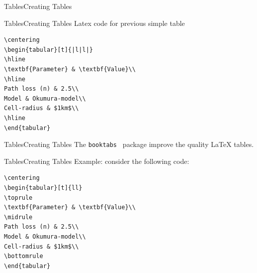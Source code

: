 \documentclass{beamer}
\begin{document}
\begin{darkframes}
\begin{frame}[fragile]{Tables}{Creating Tables}
\end{frame}

\begin{frame}[fragile]{Tables}{Creating Tables}
Latex code for previous simple table\\
	\begin{verbatim}
\centering
\begin{tabular}[t]{|l|l|}
\hline 
\textbf{Parameter} & \textbf{Value}\\
\hline 
Path loss (n) & 2.5\\
Model & Okumura-model\\
Cell-radius & $1km$\\
\hline
\end{tabular}
	\end{verbatim}
	
	
\end{frame}


\begin{frame}[fragile]{Tables}{Creating Tables}
The \alert{\texttt{booktabs }} package  improve the quality  LaTeX tables.
\end{frame}

\begin{frame}[fragile]{Tables}{Creating Tables}
	\alert{Example:} consider the following code:\
	\begin{verbatim}
\centering
\begin{tabular}[t]{ll}
\toprule
\textbf{Parameter} & \textbf{Value}\\
\midrule
Path loss (n) & 2.5\\
Model & Okumura-model\\
Cell-radius & $1km$\\
\bottomrule
\end{tabular}
	\end{verbatim}
\end{frame}


\end{darkframes}
\end{document}
